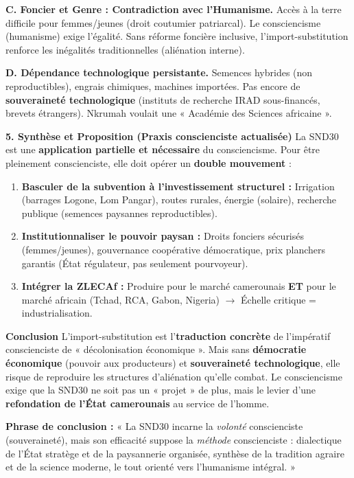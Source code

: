 \documentclass[11pt]{article}
\begin{document}
\begin{exoresolu}
\textbf{C. Foncier et Genre : Contradiction avec l'Humanisme.}
Accès à la terre difficile pour femmes/jeunes (droit coutumier patriarcal). Le consciencisme (humanisme) exige l'égalité. Sans réforme foncière inclusive, l'import-substitution renforce les inégalités traditionnelles (aliénation interne).

\textbf{D. Dépendance technologique persistante.}
Semences hybrides (non reproductibles), engrais chimiques, machines importées. Pas encore de \textbf{souveraineté technologique} (instituts de recherche IRAD sous-financés, brevets étrangers). Nkrumah voulait une « Académie des Sciences africaine ».

\textbf{5. Synthèse et Proposition (Praxis conscienciste actualisée)}
La SND30 est une \textbf{application partielle et nécessaire} du consciencisme. Pour être pleinement conscienciste, elle doit opérer un \textbf{double mouvement} :
\begin{enumerate}
    \item \textbf{Basculer de la subvention à l'investissement structurel :} Irrigation (barrages Logone, Lom Pangar), routes rurales, énergie (solaire), recherche publique (semences paysannes reproductibles).
    \item \textbf{Institutionnaliser le pouvoir paysan :} Droits fonciers sécurisés (femmes/jeunes), gouvernance coopérative démocratique, prix planchers garantis (État régulateur, pas seulement pourvoyeur).
    \item \textbf{Intégrer la ZLECAf :} Produire pour le marché camerounais \textbf{ET} pour le marché africain (Tchad, RCA, Gabon, Nigeria) $\rightarrow$ Échelle critique = industrialisation.
\end{enumerate}

\textbf{Conclusion}
L'import-substitution est l'\textbf{traduction concrète} de l'impératif conscienciste de « décolonisation économique ». Mais sans \textbf{démocratie économique} (pouvoir aux producteurs) et \textbf{souveraineté technologique}, elle risque de reproduire les structures d'aliénation qu'elle combat. Le consciencisme exige que la SND30 ne soit pas un « projet » de plus, mais le levier d'une \textbf{refondation de l'État camerounais} au service de l'homme.

\textbf{Phrase de conclusion :} « La SND30 incarne la \emph{volonté} conscienciste (souveraineté), mais son efficacité suppose la \emph{méthode} conscienciste : dialectique de l'État stratège et de la paysannerie organisée, synthèse de la tradition agraire et de la science moderne, le tout orienté vers l'humanisme intégral. »
\end{exoresolu}
\end{document}
